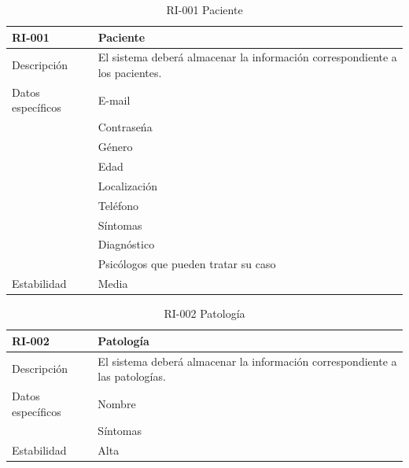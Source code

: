 \begin{table}[htpb]
\centering
\begin{tabularx}{\textwidth}{|l|X|}
\hline
RI-001            & Paciente                                                                       \\ \hline
Descripción       & El sistema deberá almacenar la información correspondiente a los pacientes.    \\ \hline
Datos específicos & E-mail                                                                         \\ 
\multirow{8}{*}{} & Contraseńa                                                                     \\ 
                  & Género                                                                         \\ 
                  & Edad                                                                           \\ 
                  & Localización                                                                   \\ 
                  & Teléfono                                                                       \\  
                  & Síntomas                                                                       \\ 
                  & Diagnóstico                                                                    \\  
                  & Psicólogos que pueden tratar su caso \\ \hline
Estabilidad       & Media                                                                          \\ \hline
\end{tabularx}
\caption{RI-001 Paciente}
\end{table}


\begin{table}[htpb]
\centering
\begin{tabularx}{\textwidth}{|l|X|}
\hline
RI-002            & Patología                                                                    \\ \hline
Descripción       & El sistema deberá almacenar la información correspondiente a las patologías. \\ \hline
Datos específicos & Nombre                                                                       \\ 
                  & Síntomas                                                                     \\ \hline
Estabilidad       & Alta                                                                         \\ \hline
\end{tabularx}
\caption{RI-002 Patología}
\end{table}


